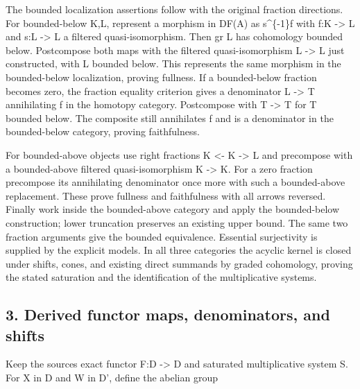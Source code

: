 \documentclass[11pt]{article}
\begin{document}
The bounded localization assertions follow with the original fraction directions. For bounded-below K,\allowbreak{}L,\allowbreak{} represent a morphism in DF(A)\allowbreak{} as s\^{}\{-1\}f with f:\allowbreak{}K \allowbreak{}-> L\textquotesingle{} and s:\allowbreak{}L \allowbreak{}-> L\textquotesingle{} a filtered quasi-isomorphism. Then gr L\textquotesingle{} has cohomology bounded below. Postcompose both maps with the filtered quasi-isomorphism L\textquotesingle{} \allowbreak{}-> L\textquotesingle\textquotesingle{} just constructed,\allowbreak{} with L\textquotesingle\textquotesingle{} bounded below. This represents the same morphism in the bounded-below localization,\allowbreak{} proving fullness. If a bounded-below fraction becomes zero,\allowbreak{} the fraction equality criterion gives a denominator L\textquotesingle{} \allowbreak{}-> T annihilating f in the homotopy category. Postcompose with T \allowbreak{}-> T\textquotesingle{} for T\textquotesingle{} bounded below. The composite still annihilates f and is a denominator in the bounded-below category,\allowbreak{} proving faithfulness.

For bounded-above objects use right fractions K \textless- K\textquotesingle{} \allowbreak{}-> L and precompose with a bounded-above filtered quasi-isomorphism K\textquotesingle\textquotesingle{} \allowbreak{}-> K\textquotesingle. For a zero fraction precompose its annihilating denominator once more with such a bounded-above replacement. These prove fullness and faithfulness with all arrows reversed. Finally work inside the bounded-above category and apply the bounded-below construction; lower truncation preserves an existing upper bound. The same two fraction arguments give the bounded equivalence. Essential surjectivity is supplied by the explicit models. In all three categories the acyclic kernel is closed under shifts,\allowbreak{} cones,\allowbreak{} and existing direct summands by graded cohomology,\allowbreak{} proving the stated saturation and the identification of the multiplicative systems.

\subsection{\texorpdfstring{3. Derived functor maps,\allowbreak{} denominators,\allowbreak{} and shifts}{3. Derived functor   and shifts}}\label{proofs-4166-5089-derived-functor-maps-denominators-and-shifts}

Keep the source\textquotesingle s exact functor F:\allowbreak{}D \allowbreak{}-> D\textquotesingle{} and saturated multiplicative system S. For X in D and W in D',\allowbreak{} define the abelian group
\end{document}
